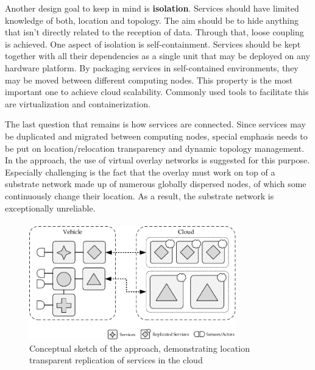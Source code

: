 Another design goal to keep in mind is \textbf{isolation}. Services should have limited knowledge of both, location and topology. The aim should be to hide anything that isn't directly related to the reception of data. Through that, loose coupling is achieved. One aspect of isolation is self-containment. Services should be kept together with all their dependencies as a single unit that may be deployed on any hardware platform. By packaging services in self-contained environments, they may be moved between different computing nodes. This property is the most important one to achieve cloud scalability. Commonly used tools to facilitate this are virtualization and containerization.

The last question that remains is how services are connected. Since services may be duplicated and migrated between computing nodes, special emphasis needs to be put on location/relocation transparency and dynamic topology management. In the approach, the use of virtual overlay networks is suggested for this purpose. Especially challenging is the fact that the overlay must work on top of a substrate network made up of numerous globally dispersed nodes, of which some continuously change their location. As a result, the substrate network is exceptionally unreliable.

\paragraph{}

\begin{figure}[htpb]
  \centering
  \includegraphics[width=0.8\textwidth]{figures/idea.pdf}
  \caption[Conceptual sketch of the approach]{Conceptual sketch of the approach, demonstrating location transparent replication of services in the cloud}\label{fig:idea} 
\end{figure}

